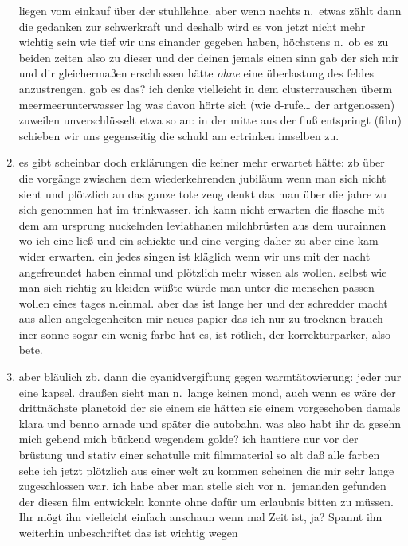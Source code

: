 \documentclass[
]{article}
\begin{document}
\begin{enumerate}
  liegen vom einkauf über der stuhllehne. aber wenn nachts n.~etwas
  zählt dann die gedanken zur schwerkraft und deshalb wird es von jetzt
  nicht mehr wichtig sein wie tief wir uns einander gegeben haben,
  höchstens n.~ob es zu beiden zeiten also zu dieser und der deinen
  jemals einen sinn gab der sich mir und dir gleichermaßen erschlossen
  hätte \emph{ohne} eine überlastung des feldes anzustrengen. gab es
  das? ich denke vielleicht in dem clusterrauschen überm
  meermeerunterwasser lag was davon hörte sich (wie d-rufe\ldots{} der
  artgenossen) zuweilen unverschlüsselt etwa so an: in der mitte aus der
  fluß entspringt (film) schieben wir uns gegenseitig die schuld am
  ertrinken imselben zu.\\
\item
  es gibt scheinbar doch erklärungen die keiner mehr erwartet hätte: zb
  über die vorgänge zwischen dem wiederkehrenden jubiläum wenn man sich
  nicht sieht und plötzlich an das ganze tote zeug denkt das man über
  die jahre zu sich genommen hat im trinkwasser. ich kann nicht erwarten
  die flasche mit dem am ursprung nuckelnden leviathanen milchbrüsten
  aus dem uurainnen wo ich eine ließ und ein schickte und eine verging
  daher zu aber eine kam wider erwarten. ein jedes singen ist kläglich
  wenn wir uns mit der nacht angefreundet haben einmal und plötzlich
  mehr wissen als wollen. selbst wie man sich richtig zu kleiden wüßte
  würde man unter die menschen passen wollen eines tages n.einmal. aber
  das ist lange her und der schredder macht aus allen angelegenheiten
  mir neues papier das ich nur zu trocknen brauch iner sonne sogar ein
  wenig farbe hat es, ist rötlich, der korrekturparker, also bete.\\
\item
  aber bläulich zb. dann die cyanidvergiftung gegen warmtätowierung:
  jeder nur eine kapsel. draußen sieht man n.~lange keinen mond, auch
  wenn es wäre der drittnächste planetoid der sie einem sie hätten sie
  einem vorgeschoben damals klara und benno arnade und später die
  autobahn. was also habt ihr da gesehn mich gehend mich bückend
  wegendem golde? ich hantiere nur vor der brüstung und stativ einer
  schatulle mit filmmaterial so alt daß alle farben sehe ich jetzt
  plötzlich aus einer welt zu kommen scheinen die mir sehr lange
  zugeschlossen war. ich habe aber man stelle sich vor n.~jemanden
  gefunden der diesen film entwickeln konnte ohne dafür um erlaubnis
  bitten zu müssen. Ihr mögt ihn vielleicht einfach anschaun wenn mal
  Zeit ist, ja? Spannt ihn weiterhin unbeschriftet das ist wichtig wegen

\end{enumerate}
\end{document}
